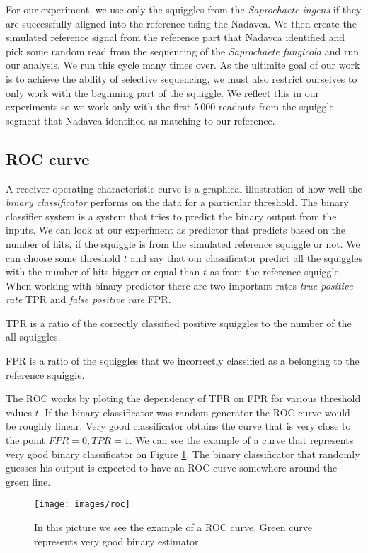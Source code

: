 For our experiment, we use only the squiggles from the \emph{Saprochaete ingens} if they
are successfully aligned into the reference using the Nadavca. We then create the
simulated reference signal from the reference part that Nadavca identified and pick
some random read from the sequencing of the \emph{Saprochaete fungicola} and run our analysis.
We run this cycle many times over. As the ultimite goal of our work is to achieve
the ability of selective sequencing, we must also restrict ourselves to only work with
the beginning part of the squiggle. We reflect this in our experiments so we
work only with the first $5\,000$ readouts from the squiggle segment that Nadavca identified
as matching to our reference.

\subsection{ROC curve}

A receiver operating characteristic curve is a graphical illustration of how well
the \textit{binary classificator} performs on the data for a particular threshold. The binary
classifier system is a system that tries to predict the binary output from the inputs.
We can look at our experiment as predictor that predicts based on the number of hits, if the squiggle is from the
simulated reference squiggle or not. We can choose some threshold $t$ and say that
our classificator predict all the squiggles with the number of hits bigger or equal
than $t$ as from the reference squiggle. When working with binary predictor there
are two important rates \textit{true positive rate} TPR and \textit{false positive rate} FPR. 

TPR is a ratio of the correctly classified positive squiggles to the number of the all squiggles.

FPR is a ratio of the squiggles that we incorrectly classified as a belonging to the reference squiggle.

The ROC works by ploting the dependency of TPR on FPR for various threshold values $t$.
If the binary classificator was random generator the ROC curve would be roughly
linear. Very good classificator obtains the curve that is very close to the point
$FPR = 0, TPR = 1$. We can see the example of a curve that represents very good
binary classificator on Figure \ref{obr:roc}. The binary classificator that randomly
guesses his output is expected to have an ROC curve somewhere around the green line.

\begin{figure}
\centerline{\texttt{[image: images/roc]}}
\caption[TODO]{In this picture we see the example of a ROC curve. Green curve represents very good
binary estimator.}
\label{obr:roc}
\end{figure}


